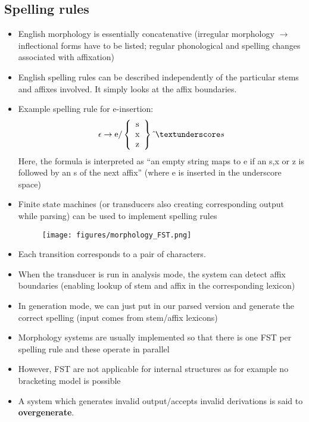 \subsection{Spelling rules}
\begin{itemize}
	\item English morphology is essentially concatenative (irregular morphology $\rightarrow$ inflectional forms have to be listed; regular phonological and spelling changes associated with affixation)
	\item English spelling rules can be described independently of the particular stems and affixes involved. It simply looks at the affix boundaries.
	\item Example spelling rule for e-insertion:
	$$\epsilon \to \text{e}/\left\{\begin{array}{c}
	\text{s}\\
	\text{x}\\
	\text{z}
	\end{array}\right\}\hat{\text{ }}\textunderscore s$$
	Here, the formula is interpreted as ``an empty string maps to e if an s,x or z is followed by an s of the next affix'' (where e is inserted in the underscore space)
	\item Finite state machines (or transducers also creating corresponding output while parsing) can be used to implement spelling rules
	\begin{figure}[ht]
		\centering
		\texttt{[image: figures/morphology\_FST.png]}
	\end{figure}
	\item Each transition corresponds to a pair of characters. 
	\item When the transducer is run in analysis mode, the system can detect affix boundaries (enabling lookup of stem and affix in the corresponding lexicon)
	\item In generation mode, we can just put in our parsed version and generate the correct spelling (input comes from stem/affix lexicons)
	\item Morphology systems are usually implemented so that there is one FST per spelling rule and these operate in parallel
	\item However, FST are not applicable for internal structures as for example no bracketing model is possible
	\item A system which generates invalid output/accepts invalid derivations is said to \textbf{overgenerate}.
\end{itemize}